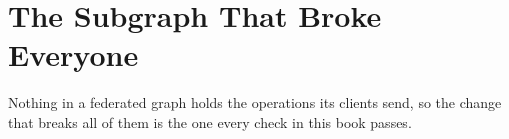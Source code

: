 \chapter{The Subgraph That Broke Everyone}
\label{ch:breaking-changes}

Nothing in a federated graph holds the operations its clients send, so the
change that breaks all of them is the one every check in this book passes.







